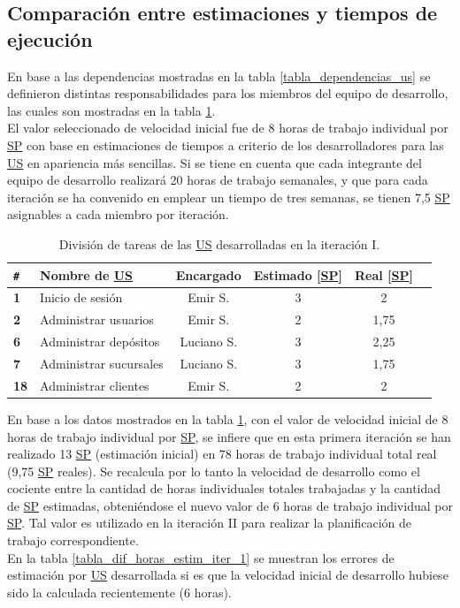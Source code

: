 \documentclass[a4paper, 12pt,twoside]{report}  %
\numberwithin{equation}{subsection} %
\begin{document}
\subsection{Comparación entre estimaciones y tiempos de ejecución}
En base a las dependencias mostradas en la tabla \ref{tabla_dependencias_us} se definieron distintas responsabilidades para los miembros del equipo de desarrollo, las cuales son mostradas en la tabla \ref{tabla_desarrollo_iter_1}.\\
\indent El valor seleccionado de velocidad inicial fue de 8 horas de trabajo individual por \hyperlink{SP}{SP} con base en estimaciones de tiempos a criterio de los desarrolladores para las \hyperlink{US}{US} en apariencia más sencillas. Si se tiene en cuenta que cada integrante del equipo de desarrollo realizará 20 horas de trabajo semanales, y que para cada iteración se ha convenido en emplear un tiempo de tres semanas, se tienen 7,5 \hyperlink{SP}{SP} asignables a cada miembro por iteración.

\begin{table}[h!]
	\centering
	\begin{tabular}{ |p{0.5cm}|p{6cm}|c|c|c|c| }
		\hline
		\verb|#|& \textbf{Nombre de \hyperlink{US}{US}}& \textbf{Encargado} & \textbf{Estimado [\hyperlink{SP}{SP}]} & \textbf{Real [\hyperlink{SP}{SP}]} \\
		\hline
		\textbf{1} & Inicio de sesión & \cellcolor{marca_US_emir}Emir S. & 3 & 2 \\
		\hline
		\textbf{2} & Administrar usuarios & \cellcolor{marca_US_emir}Emir S. & 2 & 1,75 \\
		\hline
		\textbf{6} & Administrar depósitos & \cellcolor{marca_US_luciano}Luciano S. & 3 & 2,25\\
		\hline
		\textbf{7} & Administrar sucursales & \cellcolor{marca_US_luciano}Luciano S. & 3 & 1,75 \\
		\hline
		\textbf{18} & Administrar clientes & \cellcolor{marca_US_emir}Emir S. & 2 & 2 \\
		\hline
	\end{tabular}
	\caption{División de tareas de las \protect\hyperlink{US}{US} desarrolladas en la iteración I.}
	\label{tabla_desarrollo_iter_1}
\end{table}

En base a los datos mostrados en la tabla \ref{tabla_desarrollo_iter_1}, con el valor de velocidad inicial de 8 horas de trabajo individual por \hyperlink{SP}{SP}, se infiere que en esta primera iteración se han realizado 13 \hyperlink{SP}{SP} (estimación inicial) en 78 horas de trabajo individual total real (9,75 \hyperlink{SP}{SP} reales). Se recalcula por lo tanto la velocidad de desarrollo como el cociente entre la cantidad de horas individuales totales trabajadas y la cantidad de \hyperlink{SP}{SP} estimadas, obteniéndose el nuevo valor de 6 horas de trabajo individual por \hyperlink{SP}{SP}. Tal valor es utilizado en la iteración II para realizar la planificación de trabajo correspondiente.\\
\indent En la tabla \ref{tabla_dif_horas_estim_iter_1} se muestran los errores de estimación por \hyperlink{US}{US} desarrollada si es que la velocidad inicial de desarrollo hubiese sido la calculada recientemente (6 horas).
\end{document}
